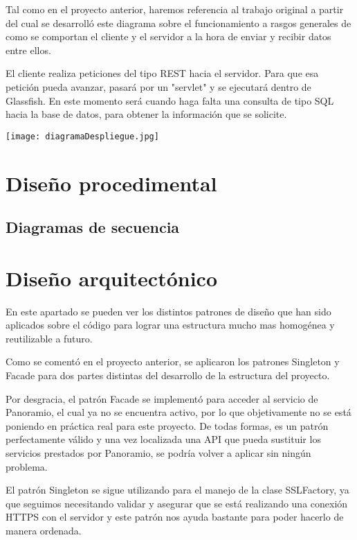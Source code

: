 Tal como en el proyecto anterior, haremos referencia al trabajo original a partir del cual se desarrolló este diagrama sobre el funcionamiento a rasgos generales de como se comportan el cliente y el servidor a la hora de enviar y recibir datos entre ellos.

El cliente realiza peticiones del tipo REST hacia el servidor. Para que esa petición pueda avanzar, pasará por un "servlet" y se ejecutará dentro de Glassfish. En este momento será cuando haga falta una consulta de tipo SQL hacia la base de datos, para obtener la información que se solicite.

\texttt{[image: diagramaDespliegue.jpg]}


\section{Diseño procedimental}

\subsection{Diagramas de secuencia}

\section{Diseño arquitectónico}

En este apartado se pueden ver los distintos patrones de diseño que han sido aplicados sobre el código para lograr una estructura mucho mas homogénea y reutilizable a futuro.

Como se comentó en el proyecto anterior, se aplicaron los patrones Singleton y Facade para dos partes distintas del desarrollo de la estructura del proyecto.

Por desgracia, el patrón Facade se implementó para acceder al servicio de Panoramio, el cual ya no se encuentra activo, por lo que objetivamente no se está poniendo en práctica real para este proyecto. De todas formas, es un patrón perfectamente válido y una vez localizada una API que pueda sustituir los servicios prestados por Panoramio, se podría volver a aplicar sin ningún problema.

El patrón Singleton se sigue utilizando para el manejo de la clase SSLFactory, ya que seguimos necesitando validar y asegurar que se está realizando una conexión HTTPS con el servidor y este patrón nos ayuda bastante para poder hacerlo de manera ordenada.


